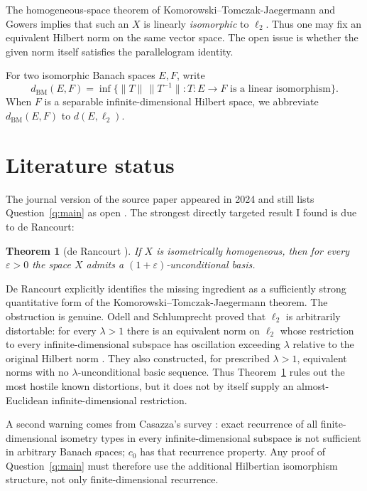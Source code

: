 \documentclass[11pt]{article}
\newtheorem{theorem}{Theorem}[section]
\theoremstyle{definition}
\begin{document}
The homogeneous-space theorem of Komorowski--Tomczak-Jaegermann and Gowers
implies that such an $X$ is linearly \emph{isomorphic} to $\ell_2$.  Thus one
may fix an equivalent Hilbert norm on the same vector space.  The open issue is
whether the given norm itself satisfies the parallelogram identity.

For two isomorphic Banach spaces $E,F$, write
\[
 d_{\mathrm{BM}}(E,F)
 =\inf\{\|T\|\,\|T^{-1}\|:T:E\to F\text{ is a linear isomorphism}\}.
\]
When $F$ is a separable infinite-dimensional Hilbert space, we abbreviate
$d_{\mathrm{BM}}(E,F)$ to $d(E,\ell_2)$.

\section{Literature status}\label{sec:literature}

The journal version of the source paper appeared in 2024 and still lists
Question~\ref{q:main} as open \cite{CDDK}.  The strongest directly targeted
result I found is due to de Rancourt:

\begin{theorem}[de Rancourt \cite{deRancourt}]\label{thm:derancourt}
If $X$ is isometrically homogeneous, then for every $\varepsilon>0$ the space
$X$ admits a $(1+\varepsilon)$-unconditional basis.
\end{theorem}

De Rancourt explicitly identifies the missing ingredient as a sufficiently
strong quantitative form of the Komorowski--Tomczak-Jaegermann theorem.  The
obstruction is genuine.  Odell and Schlumprecht proved that $\ell_2$ is
arbitrarily distortable: for every $\lambda>1$ there is an equivalent norm on
$\ell_2$ whose restriction to every infinite-dimensional subspace has
oscillation exceeding $\lambda$ relative to the original Hilbert norm
\cite{OdellSchlumprecht}.  They also constructed, for prescribed $\lambda>1$,
equivalent norms with no $\lambda$-unconditional basic sequence.  Thus
Theorem~\ref{thm:derancourt} rules out the most hostile known distortions, but
it does not by itself supply an almost-Euclidean infinite-dimensional
restriction.

A second warning comes from Casazza's survey \cite{Casazza}: exact recurrence
of all finite-dimensional isometry types in every infinite-dimensional
subspace is not sufficient in arbitrary Banach spaces; $c_0$ has that
recurrence property.  Any proof of Question~\ref{q:main} must therefore use the
additional Hilbertian isomorphism structure, not only finite-dimensional
recurrence.
\end{document}
